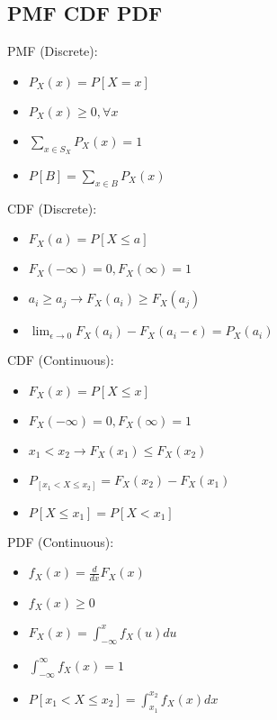 \documentclass{article}
\theoremstyle{remark}
\begin{document}
\begin{multicols*}{2}
    \subsection{PMF CDF PDF}

    PMF (Discrete):\@
    \begin{itemize}
        \item \(P_X(x) = P[X = x]\)
        \item \(P_X(x) \geq 0, \forall x\)
        \item \(\sum_{x\in S_X} P_X(x) = 1\)
        \item \(P[B] = \sum_{x\in B} P_X(x)\)
    \end{itemize}

    CDF (Discrete):\@
    \begin{itemize}
        \item \(F_X(a) = P[X \leq a]\)
        \item \(F_X(-\infty) = 0,  F_X(\infty) = 1\)
        \item \(a_i \geq a_j \rightarrow F_X(a_i) \geq F_X(a_j)\)
        \item \(\lim_{\epsilon \rightarrow 0} F_X(a_i) - F_X(a_i - \epsilon) = P_X(a_i)\)
    \end{itemize}

    CDF (Continuous):\@
    \begin{itemize}
        \item \(F_X(x) = P[X \leq x]\)
        \item \(F_X(-\infty) = 0,  F_X(\infty) = 1\)
        \item \(x_1 < x_2 \rightarrow F_X(x_1) \leq F_X(x_2)\)
        \item \(P_[x_1 < X \leq x_2] = F_X(x_2) - F_X(x_1)\)
        \item \(P[X\leq x_1] = P[X < x_1]\)
    \end{itemize}

    PDF (Continuous):\@
    \begin{itemize}
        \item \(f_X(x) = \frac{d}{dx} F_X(x)\)
        \item \(f_X(x) \geq 0\)
        \item \(F_X(x) = \int_{-\infty}^x f_X(u) du\)
        \item \(\int_{-\infty}^{\infty} f_X(x) = 1\)
        \item \(P[x_1 < X \leq x_2] = \int_{x_1}^{x_2} f_X(x)dx\)
    \end{itemize}


\end{multicols*}
\end{document}

